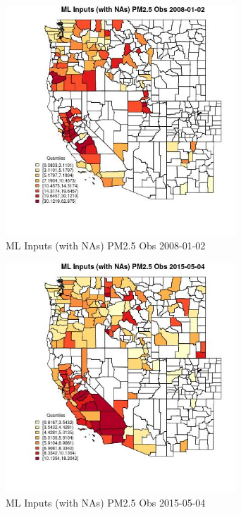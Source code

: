 \begin{figure} 
\centering  
\includegraphics[width=0.77\textwidth]{Code_Outputs/Report_ML_input_PM25_Step4_part_e_de_duplicated_aves_compiled_2019-05-18wNAs_CountyPM25_ObsMean2008-01-02_2008-01-02.jpg} 
\caption{\label{fig:Report_ML_input_PM25_Step4_part_e_de_duplicated_aves_compiled_2019-05-18wNAsCountyPM25_ObsMean2008-01-02_2008-01-02}ML Inputs (with NAs) PM2.5 Obs 2008-01-02} 
\end{figure} 
 

\begin{figure} 
\centering  
\includegraphics[width=0.77\textwidth]{Code_Outputs/Report_ML_input_PM25_Step4_part_e_de_duplicated_aves_compiled_2019-05-18wNAs_CountyPM25_ObsMean2015-05-04_2015-05-04.jpg} 
\caption{\label{fig:Report_ML_input_PM25_Step4_part_e_de_duplicated_aves_compiled_2019-05-18wNAsCountyPM25_ObsMean2015-05-04_2015-05-04}ML Inputs (with NAs) PM2.5 Obs 2015-05-04} 
\end{figure} 
 

